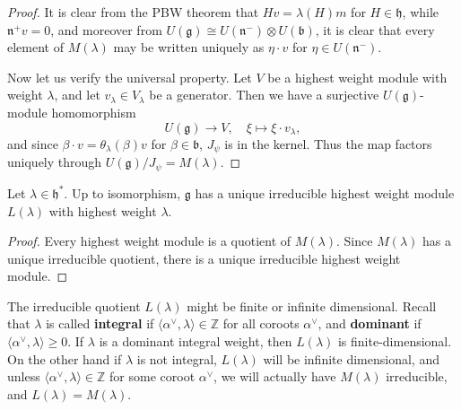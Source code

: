 \documentclass[12pt]{article}
\begin{document}
\begin{proof}
    It is clear from the PBW theorem that $H v = \lambda(H)m$ for $H \in \mathfrak{h}$, while $\mathfrak{n}^+ v = 0$, and moreover from $U(\mathfrak{g}) \cong U(\mathfrak{n}^-) \otimes U(\mathfrak{b})$, it is clear that every element of $M(\lambda)$ may be written uniquely as $\eta \cdot v$ for $\eta \in U(\mathfrak{n}^-)$.

    Now let us verify the universal property. Let $V$ be a highest weight module with weight $\lambda$, and let $v_\lambda \in V_\lambda$ be a generator. Then we have a surjective $U(\mathfrak{g})$-module homomorphism
    \[
        U(\mathfrak{g}) \to V, \quad \xi \mapsto \xi \cdot v_\lambda,
    \]
    and since $\beta \cdot v = \theta_\lambda(\beta)v$ for $\beta \in \mathfrak{b}$, $J_\psi$ is in the kernel. Thus the map factors uniquely through $U(\mathfrak{g})/J_\psi = M(\lambda)$.
\end{proof}

\begin{corollary}
    Let $\lambda \in \mathfrak{h}^*$. Up to isomorphism, $\mathfrak{g}$ has a unique irreducible highest weight module $L(\lambda)$ with highest weight $\lambda$.
\end{corollary}

\begin{proof}
    Every highest weight module is a quotient of $M(\lambda)$. Since $M(\lambda)$ has a unique irreducible quotient, there is a unique irreducible highest weight module.
\end{proof}

\begin{remark}
    The irreducible quotient $L(\lambda)$ might be finite or infinite dimensional. Recall that $\lambda$ is called \textbf{integral} if $\langle \alpha^\vee, \lambda \rangle \in \mathbb{Z}$ for all coroots $\alpha^\vee$, and \textbf{dominant} if $\langle \alpha^\vee, \lambda \rangle \geq 0$. If $\lambda$ is a dominant integral weight, then $L(\lambda)$ is finite-dimensional. On the other hand if $\lambda$ is not integral, $L(\lambda)$ will be infinite dimensional, and unless $\langle \alpha^\vee, \lambda \rangle \in \mathbb{Z}$ for some coroot $\alpha^\vee$, we will actually have $M(\lambda)$ irreducible, and $L(\lambda) = M(\lambda)$.
\end{remark}
\end{document}
